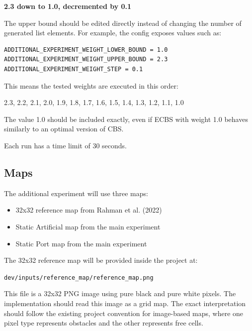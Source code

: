 \documentclass[11pt,a4paper]{article}
\begin{document}
\begin{center}
\textbf{2.3 down to 1.0, decremented by 0.1}
\end{center}

The upper bound should be edited directly instead of changing the number of generated list elements. For example, the config exposes values such as:

\begin{verbatim}
ADDITIONAL_EXPERIMENT_WEIGHT_LOWER_BOUND = 1.0
ADDITIONAL_EXPERIMENT_WEIGHT_UPPER_BOUND = 2.3
ADDITIONAL_EXPERIMENT_WEIGHT_STEP = 0.1
\end{verbatim}

This means the tested weights are executed in this order:

\begin{center}
2.3, 2.2, 2.1, 2.0, 1.9, 1.8, 1.7, 1.6, 1.5, 1.4, 1.3, 1.2, 1.1, 1.0
\end{center}

The value 1.0 should be included exactly, even if ECBS with weight 1.0 behaves similarly to an optimal version of CBS.

Each run has a time limit of 30 seconds.

\subsection*{Maps}

The additional experiment will use three maps:

\begin{itemize}[leftmargin=2em]
    \item 32x32 reference map from Rahman et al. (2022)
    \item Static Artificial map from the main experiment
    \item Static Port map from the main experiment
\end{itemize}

The 32x32 reference map will be provided inside the project at:

\begin{center}
\texttt{dev/inputs/reference\_map/reference\_map.png}
\end{center}

This file is a 32x32 PNG image using pure black and pure white pixels. The implementation should read this image as a grid map. The exact interpretation should follow the existing project convention for image-based maps, where one pixel type represents obstacles and the other represents free cells.
\end{document}
